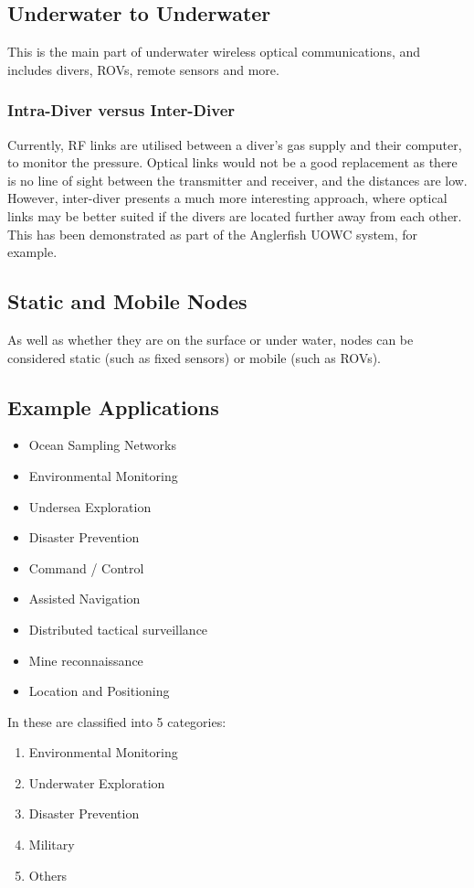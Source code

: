 \subsection{Underwater to Underwater}
This is the main part of underwater wireless optical communications, and
includes divers, \ac{ROV}s, remote sensors and more.

\subsubsection{Intra-Diver versus Inter-Diver}
Currently, \ac{RF} links are utilised between a diver's gas supply and
their computer, to monitor the pressure. Optical links would not be
a good replacement as there is no line of sight between the transmitter
and receiver, and the distances are low. However, inter-diver presents
a much more interesting approach, where optical links may be better suited
if the divers are located further away from each other. This has been
demonstrated as part of the Anglerfish \ac{UOWC} system, for example.

\subsection{Static and Mobile Nodes}
As well as whether they are on the surface or under water, nodes can be
considered static (such as fixed sensors) or mobile (such as \ac{ROV}s).

\subsection{Example Applications}
\begin{itemize}
\item{Ocean Sampling Networks}
\item{Environmental Monitoring}
\item{Undersea Exploration}
\item{Disaster Prevention}
\item{Command / Control}
\item{Assisted Navigation}
\item{Distributed tactical surveillance}
\item{Mine reconnaissance}
\item{Location and Positioning}
\end{itemize}

In \cite{iout_comprehensive} these are classified into 5 categories:
\begin{enumerate}
\item{Environmental Monitoring}
\item{Underwater Exploration}
\item{Disaster Prevention}
\item{Military}
\item{Others}
\end{enumerate}

